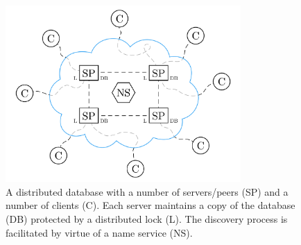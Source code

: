 \begin{figure}
  \centering
  \includegraphics[width=0.8\textwidth]{include/assets/distributed-database.pdf}
  \caption{A distributed database with a number of servers/peers (SP) and a number of clients (C). Each server maintains a copy of the database (DB) protected by a distributed lock (L). The discovery process is facilitated by virtue of a name service (NS).}
\end{figure}
